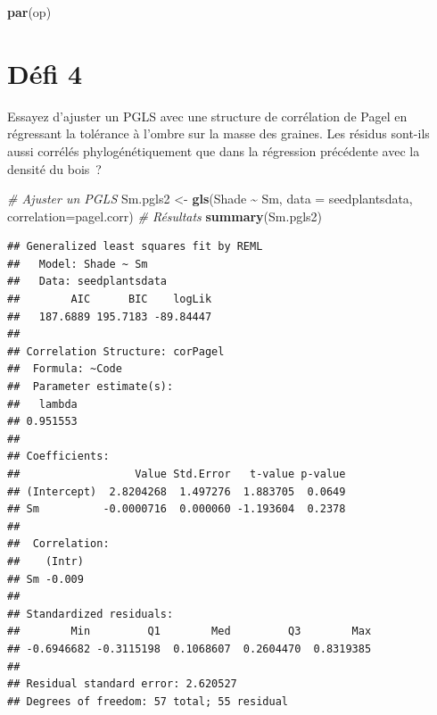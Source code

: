 \documentclass[
]{book}
\newenvironment{Shaded}{\begin{snugshade}}{\end{snugshade}}
\newcommand{\AttributeTok}[1]{\textcolor[rgb]{0.13,0.29,0.53}{#1}}
\newcommand{\CommentTok}[1]{\textcolor[rgb]{0.56,0.35,0.01}{\textit{#1}}}
\newcommand{\FunctionTok}[1]{\textcolor[rgb]{0.13,0.29,0.53}{\textbf{#1}}}
\newcommand{\NormalTok}[1]{#1}
\newcommand{\OtherTok}[1]{\textcolor[rgb]{0.56,0.35,0.01}{#1}}
\newcommand{\SpecialCharTok}[1]{\textcolor[rgb]{0.81,0.36,0.00}{\textbf{#1}}}
\begin{document}
\begin{Shaded}
\begin{Highlighting}[]
\FunctionTok{par}\NormalTok{(op)}
\end{Highlighting}
\end{Shaded}

\section{Défi 4}\label{duxe9fi-4}

Essayez d'ajuster un PGLS avec une structure de corrélation de Pagel en régressant la tolérance à l'ombre sur la masse des graines. Les résidus sont-ils aussi corrélés phylogénétiquement que dans la régression précédente avec la densité du bois~?

\begin{Shaded}
\begin{Highlighting}[]
\CommentTok{\# Ajuster un PGLS}
\NormalTok{Sm.pgls2 }\OtherTok{\textless{}{-}} \FunctionTok{gls}\NormalTok{(Shade }\SpecialCharTok{\textasciitilde{}}\NormalTok{ Sm, }\AttributeTok{data =}\NormalTok{ seedplantsdata, }\AttributeTok{correlation=}\NormalTok{pagel.corr)}
\CommentTok{\# Résultats}
\FunctionTok{summary}\NormalTok{(Sm.pgls2)}
\end{Highlighting}
\end{Shaded}

\begin{verbatim}
## Generalized least squares fit by REML
##   Model: Shade ~ Sm 
##   Data: seedplantsdata 
##        AIC      BIC    logLik
##   187.6889 195.7183 -89.84447
## 
## Correlation Structure: corPagel
##  Formula: ~Code 
##  Parameter estimate(s):
##   lambda 
## 0.951553 
## 
## Coefficients:
##                  Value Std.Error   t-value p-value
## (Intercept)  2.8204268  1.497276  1.883705  0.0649
## Sm          -0.0000716  0.000060 -1.193604  0.2378
## 
##  Correlation: 
##    (Intr)
## Sm -0.009
## 
## Standardized residuals:
##        Min         Q1        Med         Q3        Max 
## -0.6946682 -0.3115198  0.1068607  0.2604470  0.8319385 
## 
## Residual standard error: 2.620527 
## Degrees of freedom: 57 total; 55 residual
\end{verbatim}

  
\end{document}

